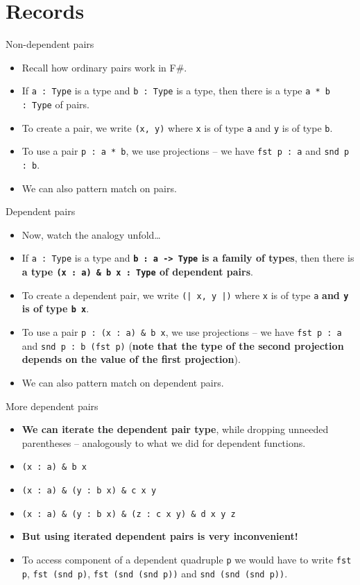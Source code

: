 \documentclass{beamer}
\newcommand{\m}[1]{\texttt{#1}}
\begin{document}
\section{Records}

\begin{frame}{Non-dependent pairs}
\begin{itemize}
	\item Recall how ordinary pairs work in F\#.
	\item If \m{a :\ Type} is a type and \m{b :\ Type} is a type, then there is a type \m{a * b :\ Type} of pairs.
	\item To create a pair, we write \m{(x, y)} where \m{x} is of type \m{a} and \m{y} is of type \m{b}.
	\item To use a pair \m{p :\ a * b}, we use projections -- we have \m{fst p :\ a} and \m{snd p :\ b}.
	\item We can also pattern match on pairs.
\end{itemize}
\end{frame}

\begin{frame}{Dependent pairs}
\begin{itemize}
	\item Now, watch the analogy unfold\dots
	\item If \m{a :\ Type} is a type and \textbf{\m{b :\ a -> Type} is a family of types}, then there is \textbf{a type \m{(x :\ a) \& b x :\ Type} of dependent pairs}.
	\item To create a dependent pair, we write \m{(| x, y |)} where \m{x} is of type \m{a} \textbf{and \m{y} is of type \m{b x}}.
	\item To use a pair \m{p :\ (x :\ a) \& b x}, we use projections -- we have \m{fst p :\ a} and \m{snd p :\ b (fst p)} (\textbf{note that the type of the second projection depends on the value of the first projection}).
	\item We can also pattern match on dependent pairs.
\end{itemize}
\end{frame}

\begin{frame}{More dependent pairs}
\begin{itemize}
	\item \textbf{We can iterate the dependent pair type}, while dropping unneeded parentheses -- analogously to what we did for dependent functions.
	\item \m{(x :\ a) \& b x}
	\item \m{(x :\ a) \& (y :\ b x) \& c x y}
	\item \m{(x :\ a) \& (y :\ b x) \& (z :\ c x y) \& d x y z}
	\item \textbf{But using iterated dependent pairs is very inconvenient!}
	\item To access component of a dependent quadruple \m{p} we would have to write \m{fst p}, \m{fst (snd p)}, \m{fst (snd (snd p))} and \m{snd (snd (snd p))}.
\end{itemize}
\end{frame}
\end{document}
